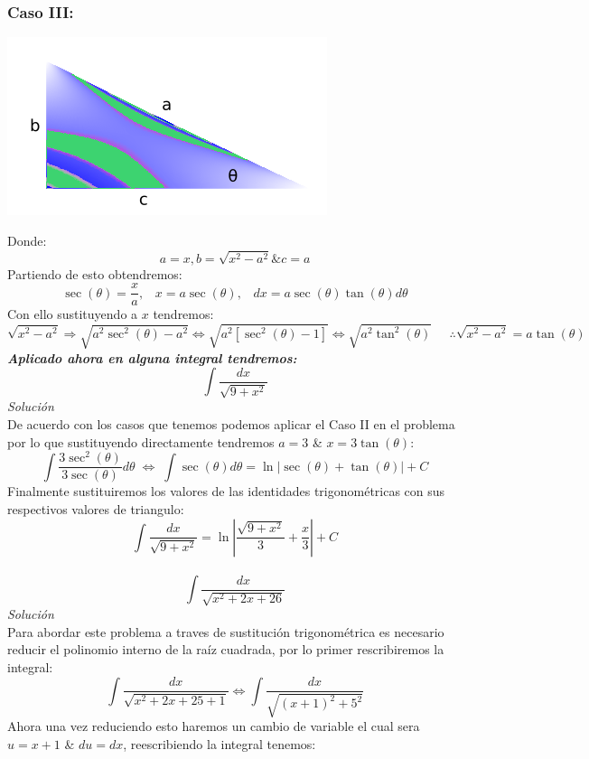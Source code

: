 \documentclass[10pt]{article}
\begin{document}
\subsubsection{Caso III:}
\begin{center}
  \includegraphics[scale=0.5]{imgsAux/triangulo2.png}\\
\end{center}
Donde:
\[a=x, b=\sqrt{x^{2}-a^{2}} \& c=a\]
Partiendo de esto obtendremos:
\[\sec(\theta)= \frac{x}{a},\;\;\; x=a\sec(\theta),\;\;\; dx=a\sec(\theta)\tan(\theta)d\theta\]
Con ello sustituyendo a $x$ tendremos:
\[\sqrt{x^{2}-a^{2}}\Rightarrow \sqrt{a^{2}\sec^{2}(\theta)-a^{2}} \Leftrightarrow \sqrt{a^{2}[\sec^{2}(\theta)-1]} \Leftrightarrow \sqrt{a^{2}\tan^{2}(\theta)}\;\;\;\;\; \therefore \sqrt{x^{2}-a^{2}}=a\tan(\theta)\]
\textit{\textbf{Aplicado ahora en alguna integral tendremos:}}\\
\[\int \frac{dx}{\sqrt{9+x^{2}}}\]
\textit{Solución}\\
De acuerdo con los casos que tenemos podemos aplicar el Caso II en el problema por lo que sustituyendo directamente tendremos $a=3$ \& $x=3\tan(\theta)$:
\[\int \frac{3\sec^{2}(\theta)}{3\sec(\theta)}d\theta \; \Leftrightarrow \; \int \sec(\theta)d\theta = \ln\left|\sec(\theta)+\tan(\theta)\right|+C\]
Finalmente sustituiremos los valores de las identidades trigonométricas con sus respectivos valores de triangulo:
\[\int \frac{dx}{\sqrt{9+x^{2}}}= \ln\left|\frac{\sqrt{9+x^{2}}}{3}+\frac{x}{3}\right|+C\]
\\\vspace{0.5cm}
\[\int\frac{dx}{\sqrt{x^{2}+2x+26}}\]
\textit{Solución}\\
Para abordar este problema a traves de sustitución trigonométrica es necesario reducir el polinomio interno de la raíz cuadrada, por lo primer rescribiremos la integral:
\[\int \frac{dx}{\sqrt{x^{2}+2x+25+1}}\Leftrightarrow \int \frac{dx}{\sqrt{(x+1)^{2}+5^{2}}}\]
Ahora una vez reduciendo esto haremos un cambio de variable el cual sera $u=x+1$ \& $du=dx$, reescribiendo la integral tenemos:
\end{document}
